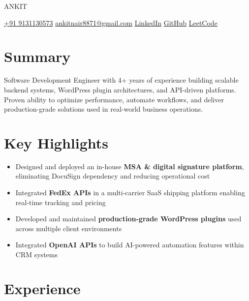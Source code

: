 \documentclass[11pt]{article}
\begin{document}
\begin{center}
{\fontsize{26}{12}\selectfont \color{accent} ANKIT} \\ \medskip

\href{tel:+919131130573}{{\faPhone} +91 9131130573} \quad
\href{mailto:ankitnair8871@gmail.com}{{\faEnvelope} ankitnair8871@gmail.com} \quad
\href{https://www.linkedin.com/in/ankit-nair-a57414187}{{\faLinkedin} LinkedIn} \quad
\href{https://github.com/ankit8871261605}{{\faGithub} GitHub} \quad
\href{https://leetcode.com/u/ankitnair8871/}{{\faCode} LeetCode}
\end{center}

\section{Summary}
Software Development Engineer with 4+ years of experience building scalable backend systems, WordPress plugin architectures, and API-driven platforms. Proven ability to optimize performance, automate workflows, and deliver production-grade solutions used in real-world business operations.

\section{Key Highlights}
\begin{itemize}
\item Designed and deployed an in-house \textbf{MSA \& digital signature platform}, eliminating DocuSign dependency and reducing operational cost
\item Integrated \textbf{FedEx APIs} in a multi-carrier SaaS shipping platform enabling real-time tracking and pricing
\item Developed and maintained \textbf{production-grade WordPress plugins} used across multiple client environments
\item Integrated \textbf{OpenAI APIs} to build AI-powered automation features within CRM systems
\end{itemize}

\section{Experience}
\end{document}
